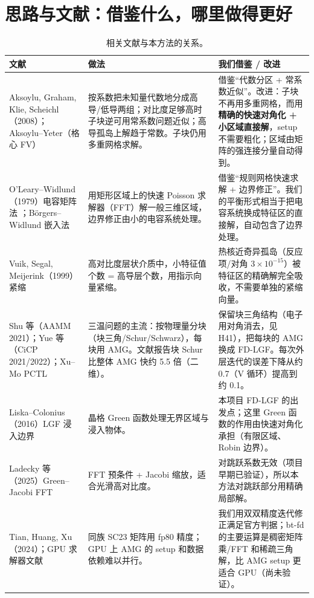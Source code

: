 \documentclass[11pt,a4paper]{ctexart}
\begin{document}
\section{思路与文献：借鉴什么，哪里做得更好}
\begin{table}[H]
\centering\small
\begin{tabular}{p{4.0cm}p{5.3cm}p{6.1cm}}
\toprule
文献 & 做法 & 我们借鉴 / 改进 \\
\midrule
Aksoylu, Graham, Klie, Scheichl（2008）\cite{agks}；Aksoylu--Yeter（格心 FV）\cite{ay} &
按系数把未知量代数地分成高导/低导两组；对比度足够高时子块逆可用常系数问题近似；高导孤岛上解趋于常数。子块仍用多重网格求解。 &
借鉴“代数分区 + 常系数近似”。改进：子块不再用多重网格，而用\textbf{精确的快速对角化 + 小区域直接解}，setup 不需要粗化；区域由矩阵的强连接分量自动得到。 \\
\addlinespace
O'Leary--Widlund（1979）电容矩阵法 \cite{ow}；Börgers--Widlund 嵌入法 &
用矩形区域上的快速 Poisson 求解器（FFT）解一般三维区域，边界修正由小的电容系统处理。 &
借鉴“规则网格快速求解 + 边界修正”。我们的平衡形式相当于把电容系统换成特征区的直接解，自动包含了边界处理。 \\
\addlinespace
Vuik, Segal, Meijerink（1999）紧缩 &
高对比度层状介质中，小特征值个数 = 高导层个数，用指示向量紧缩。 &
热核近奇异孤岛（反应项/对角 $3\times10^{-15}$）被特征区的精确解完全吸收，不需要单独的紧缩向量。 \\
\addlinespace
Shu 等（AAMM 2021）\cite{shu}；Yue 等（CiCP 2021/2022）；Xu--Mo PCTL &
三温问题的主流：按物理量分块（块三角/Schur/Schwarz），每块用 AMG。文献报告块 Schur 比整体 AMG 快约 5.5 倍（二维）。 &
保留块三角结构（电子用对角消去，见 H41），把每块的 AMG 换成 FD-LGF。每次外层迭代的误差下降从约 0.7（V 循环）提高到约 0.1。 \\
\addlinespace
Liska--Colonius（2016）LGF 浸入边界 \cite{lc} &
晶格 Green 函数处理无界区域与浸入物体。 &
本项目 FD-LGF 的出发点；这里 Green 函数的作用由快速对角化承担（有限区域、Robin 边界）。 \\
\addlinespace
Ladecky 等（2025）Green--Jacobi FFT \cite{lad} &
FFT 预条件 + Jacobi 缩放，适合光滑高对比度。 &
对跳跃系数无效（项目早期已验证），所以本方法对跳跃部分用精确局部解。 \\
\addlinespace
Tian, Huang, Xu（2024）\cite{tian}；GPU 求解器文献 &
同族 SC23 矩阵用 fp80 精度；GPU 上 AMG 的 setup 和数据依赖难以并行。 &
我们用双双精度迭代修正满足官方判据；bt-fd 的主要运算是稠密矩阵乘/FFT 和稀疏三角解，比 AMG setup 更适合 GPU（尚未验证）。 \\
\bottomrule
\end{tabular}
\caption{相关文献与本方法的关系。}
\end{table}
\end{document}
